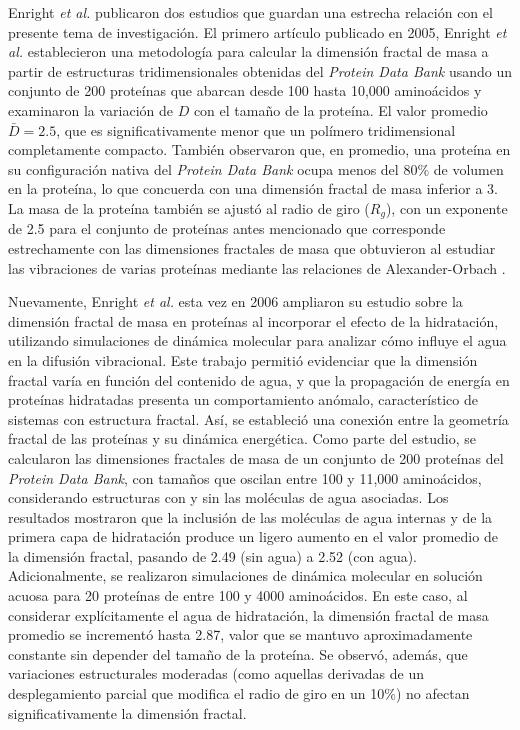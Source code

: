 Enright \textit{et al.} publicaron dos estudios que guardan una estrecha relaci\'{o}n con el presente tema de investigaci\'{o}n. El primero art\'{i}culo publicado en 2005, Enright \textit{et al.}
\cite{Enright2005} establecieron una metodolog\'{i}a  para calcular la dimensi\'{o}n fractal de masa a partir de estructuras tridimensionales obtenidas del \textit{Protein Data Bank} usando un conjunto de 200 prote\'{i}nas que abarcan desde 100 hasta 10,000 amino\'{a}cidos y examinaron la variaci\'{o}n de $D$ con el tamaño de la prote\'{i}na. El valor promedio $\bar{D} = 2.5$, que es significativamente menor que un pol\'{i}mero tridimensional completamente compacto. Tambi\'{e}n observaron que, en promedio, una prote\'{i}na en su configuraci\'{o}n nativa del \textit{Protein Data Bank} ocupa menos del $80\%$ de volumen en la prote\'{i}na, lo que concuerda con una dimensi\'{o}n fractal de masa inferior a 3. La masa de la prote\'{i}na tambi\'{e}n se ajust\'{o} al radio de giro ($R_g$), con un exponente de 2.5 para el conjunto de prote\'{i}nas antes mencionado que corresponde estrechamente con las dimensiones fractales de masa que obtuvieron al estudiar las vibraciones de varias prote\'{i}nas mediante las relaciones de Alexander-Orbach \cite{Alexander1982}.
 
 Nuevamente, Enright \textit{et al.}\cite{Enright2006} esta vez en 2006 ampliaron su estudio sobre la dimensi\'{o}n fractal de masa en prote\'{i}nas al incorporar el efecto de la hidrataci\'{o}n, utilizando simulaciones de din\'{a}mica molecular para analizar c\'{o}mo influye el agua en la difusi\'{o}n vibracional. Este trabajo permiti\'{o} evidenciar que la dimensi\'{o}n fractal var\'{i}a en funci\'{o}n del contenido de agua, y que la propagaci\'{o}n de energ\'{i}a en prote\'{i}nas hidratadas presenta un comportamiento an\'{o}malo, caracter\'{i}stico de sistemas con estructura fractal. As\'{i}, se estableci\'{o} una conexi\'{o}n entre la geometr\'{i}a fractal de las prote\'{i}nas y su din\'{a}mica energ\'{e}tica. Como parte del estudio, se calcularon las dimensiones fractales de masa de un conjunto de 200 prote\'{i}nas del \textit{Protein Data Bank}, con tamaños que oscilan entre 100 y 11,000 amino\'{a}cidos, considerando estructuras con y sin las mol\'{e}culas de agua asociadas. Los resultados mostraron que la inclusi\'{o}n de las mol\'{e}culas de agua internas y de la primera capa de hidrataci\'{o}n produce un ligero aumento en el valor promedio de la dimensi\'{o}n fractal, pasando de 2.49 (sin agua) a 2.52 (con agua). Adicionalmente, se realizaron simulaciones de din\'{a}mica molecular en soluci\'{o}n acuosa para 20 prote\'{i}nas de entre 100 y 4000 amino\'{a}cidos. En este caso, al considerar expl\'{i}citamente el agua de hidrataci\'{o}n, la dimensi\'{o}n fractal de masa promedio se increment\'{o} hasta 2.87, valor que se mantuvo aproximadamente constante sin depender del tamaño de la prote\'{i}na. Se observ\'{o}, adem\'{a}s, que variaciones estructurales moderadas (como aquellas derivadas de un desplegamiento parcial que modifica el radio de giro en un 10\%) no afectan significativamente la dimensi\'{o}n fractal.

